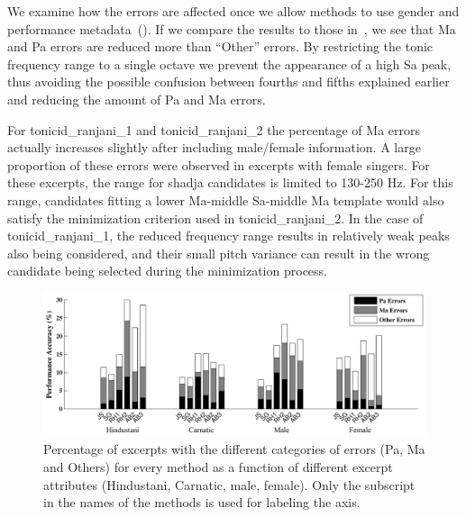 {We examine how the errors are affected once we allow methods to use gender and performance metadata~(). If we compare the results to those in~, we see
that Ma and Pa errors are reduced more than ``Other'' errors. By restricting the tonic frequency range to a single octave we prevent the
appearance of a high Sa peak, thus avoiding the possible confusion between fourths and fifths explained earlier and reducing the amount of Pa and Ma errors.

For \acrshort{tonicid_ranjani_1} and \acrshort{tonicid_ranjani_2} the percentage of Ma errors actually increases slightly after including male/female information. A large proportion of these errors were observed in excerpts with female singers. For these excerpts, the range for \gls{shadja} candidates is limited to 130-250 Hz. For this range, candidates fitting a lower Ma-middle Sa-middle Ma template would also satisfy the minimization criterion used in \acrshort{tonicid_ranjani_2}. In the case of \acrshort{tonicid_ranjani_1}, the reduced frequency range results in relatively weak peaks also being considered, and their small pitch variance can result in the wrong candidate being selected during the minimization process.

\begin{figure}
	\begin{center}
		\includegraphics[width=\figSizeHundred]{ch05_preprocessing/figures/Category_Errors.pdf}
	\end{center}
	\caption[Percentage of Pa, Ma and `Other' type errors in tonic identification for different categories]{Percentage of excerpts with the different categories of errors (Pa, Ma and Others) for every method as a function of different excerpt attributes (Hindustani, Carnatic, male, female). Only the subscript in the names of the methods is used for labeling the axis.}
	\label{fig:tonic_identification_categorywise_errors}
\end{figure}

}
